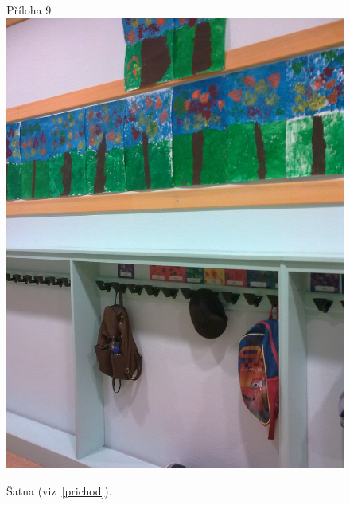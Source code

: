 	\begin{figure}[tb]
		\centering
		Příloha 9\\
		\includegraphics[height = 0.35\textheight]{./fotky/Obr9.jpg}
		\caption{
			Šatna (viz~\ref{prichod}).
		}
		\label{Obr9}
	\end{figure}



